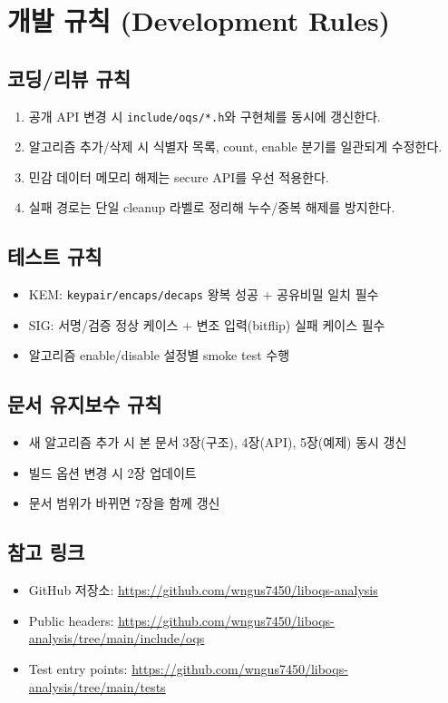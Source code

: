 \section{개발 규칙 (Development Rules)}

\subsection{코딩/리뷰 규칙}
\begin{enumerate}[leftmargin=*]
\item 공개 API 변경 시 \texttt{include/oqs/*.h}와 구현체를 동시에 갱신한다.
\item 알고리즘 추가/삭제 시 식별자 목록, count, enable 분기를 일관되게 수정한다.
\item 민감 데이터 메모리 해제는 secure API를 우선 적용한다.
\item 실패 경로는 단일 cleanup 라벨로 정리해 누수/중복 해제를 방지한다.
\end{enumerate}

\subsection{테스트 규칙}
\begin{itemize}[leftmargin=*]
\item KEM: \texttt{keypair/encaps/decaps} 왕복 성공 + 공유비밀 일치 필수
\item SIG: 서명/검증 정상 케이스 + 변조 입력(bitflip) 실패 케이스 필수
\item 알고리즘 enable/disable 설정별 smoke test 수행
\end{itemize}

\subsection{문서 유지보수 규칙}
\begin{itemize}[leftmargin=*]
\item 새 알고리즘 추가 시 본 문서 3장(구조), 4장(API), 5장(예제) 동시 갱신
\item 빌드 옵션 변경 시 2장 업데이트
\item 문서 범위가 바뀌면 7장을 함께 갱신
\end{itemize}

\subsection{참고 링크}
\begin{itemize}[leftmargin=*]
\item GitHub 저장소: \url{https://github.com/wngus7450/liboqs-analysis}
\item Public headers: \url{https://github.com/wngus7450/liboqs-analysis/tree/main/include/oqs}
\item Test entry points: \url{https://github.com/wngus7450/liboqs-analysis/tree/main/tests}
\end{itemize}
